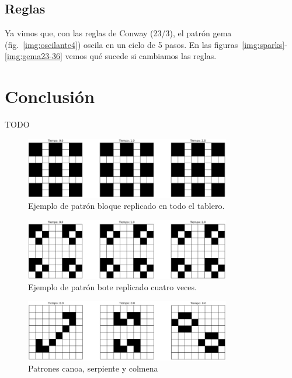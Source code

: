 \documentclass[12pt]{article}
\begin{document}
\subsection*{Reglas}

Ya vimos que, con las reglas de Conway (23/3), el patrón gema (fig.~\ref{img:oscilante4}) oscila en un ciclo de 5 pasos. En las figuras~\ref{img:sparks}-\ref{img:gema23-36} vemos qué sucede si cambiamos las reglas.


\section{Conclusión}

TODO


\begin{figure}[h]
  \centering
  \includegraphics[width=0.8\textwidth]{imagenes/estatico1.png}
  \caption{Ejemplo de patrón bloque replicado en todo el tablero.\label{img:estatico1}}
\end{figure}

\begin{figure}
  \centering
  \includegraphics[width=0.8\textwidth]{imagenes/estatico2.png}
  \caption{Ejemplo de patrón bote replicado cuatro veces.\label{img:estatico2}}
\end{figure}

\begin{figure}
  \centering
  \includegraphics[width=0.8\textwidth]{imagenes/estatico3.png}
  \caption{Patrones canoa, serpiente y colmena\label{img:estatico3}}
\end{figure}
\end{document}
